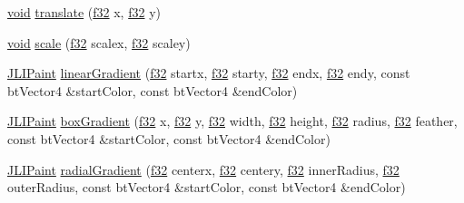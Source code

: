 \begin{DoxyCompactItemize}
\item 
\mbox{\hyperlink{_thread_8h_af1e856da2e658414cb2456cb6f7ebc66}{void}} \mbox{\hyperlink{classnjli_1_1_world_h_u_d_abd989561682767b35d557221124e4883}{translate}} (\mbox{\hyperlink{_util_8h_a5f6906312a689f27d70e9d086649d3fd}{f32}} x, \mbox{\hyperlink{_util_8h_a5f6906312a689f27d70e9d086649d3fd}{f32}} y)
\item 
\mbox{\hyperlink{_thread_8h_af1e856da2e658414cb2456cb6f7ebc66}{void}} \mbox{\hyperlink{classnjli_1_1_world_h_u_d_a14be92646f0a40e08b738dd0a3492329}{scale}} (\mbox{\hyperlink{_util_8h_a5f6906312a689f27d70e9d086649d3fd}{f32}} scalex, \mbox{\hyperlink{_util_8h_a5f6906312a689f27d70e9d086649d3fd}{f32}} scaley)
\item 
\mbox{\hyperlink{structnjli_1_1_j_l_i_paint}{J\+L\+I\+Paint}} \mbox{\hyperlink{classnjli_1_1_world_h_u_d_aefa0dd5d84a7571fd9228e2d2b25eb46}{linear\+Gradient}} (\mbox{\hyperlink{_util_8h_a5f6906312a689f27d70e9d086649d3fd}{f32}} startx, \mbox{\hyperlink{_util_8h_a5f6906312a689f27d70e9d086649d3fd}{f32}} starty, \mbox{\hyperlink{_util_8h_a5f6906312a689f27d70e9d086649d3fd}{f32}} endx, \mbox{\hyperlink{_util_8h_a5f6906312a689f27d70e9d086649d3fd}{f32}} endy, const bt\+Vector4 \&start\+Color, const bt\+Vector4 \&end\+Color)
\item 
\mbox{\hyperlink{structnjli_1_1_j_l_i_paint}{J\+L\+I\+Paint}} \mbox{\hyperlink{classnjli_1_1_world_h_u_d_a7263a3a9af4c3db96bdd1d8755bb6d88}{box\+Gradient}} (\mbox{\hyperlink{_util_8h_a5f6906312a689f27d70e9d086649d3fd}{f32}} x, \mbox{\hyperlink{_util_8h_a5f6906312a689f27d70e9d086649d3fd}{f32}} y, \mbox{\hyperlink{_util_8h_a5f6906312a689f27d70e9d086649d3fd}{f32}} width, \mbox{\hyperlink{_util_8h_a5f6906312a689f27d70e9d086649d3fd}{f32}} height, \mbox{\hyperlink{_util_8h_a5f6906312a689f27d70e9d086649d3fd}{f32}} radius, \mbox{\hyperlink{_util_8h_a5f6906312a689f27d70e9d086649d3fd}{f32}} feather, const bt\+Vector4 \&start\+Color, const bt\+Vector4 \&end\+Color)
\item 
\mbox{\hyperlink{structnjli_1_1_j_l_i_paint}{J\+L\+I\+Paint}} \mbox{\hyperlink{classnjli_1_1_world_h_u_d_a912072b46da8889ca18c84e05c8ac7e4}{radial\+Gradient}} (\mbox{\hyperlink{_util_8h_a5f6906312a689f27d70e9d086649d3fd}{f32}} centerx, \mbox{\hyperlink{_util_8h_a5f6906312a689f27d70e9d086649d3fd}{f32}} centery, \mbox{\hyperlink{_util_8h_a5f6906312a689f27d70e9d086649d3fd}{f32}} inner\+Radius, \mbox{\hyperlink{_util_8h_a5f6906312a689f27d70e9d086649d3fd}{f32}} outer\+Radius, const bt\+Vector4 \&start\+Color, const bt\+Vector4 \&end\+Color)
\item 

\end{DoxyCompactItemize}
